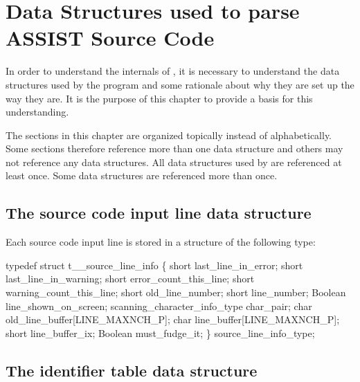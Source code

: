 \section{Data Structures used to parse ASSIST Source Code}
\label{chap:parsedata}

In order to understand the internals of , it is necessary
to understand the data structures used by the program and some rationale
about why they are set up the way they are.   It is the purpose of this
chapter to provide a basis for this understanding.

The sections in this chapter are organized topically instead of alphabetically.
Some sections therefore reference more than one data structure and others
may not reference any data structures.   All data structures used by
 are referenced at least once.  Some data structures
are referenced more than once.

\subsection{The source code input line data structure}
\label{sec:srcline}

Each source code input line is stored in a structure of the following type:
\begin{codeexample}
typedef struct t__source_line_info
   \{
        short last_line_in_error;
        short last_line_in_warning;
        short error_count_this_line;
        short warning_count_this_line;
        short old_line_number;
        short line_number;
        Boolean line_shown_on_screen;
        scanning_character_info_type char_pair;
        char old_line_buffer[LINE_MAXNCH_P];
        char line_buffer[LINE_MAXNCH_P];
        short line_buffer_ix;
        Boolean must_fudge_it;
   \} source_line_info_type;
\end{codeexample}


\subsection{The identifier table data structure}
\label{sec:idinfo}

